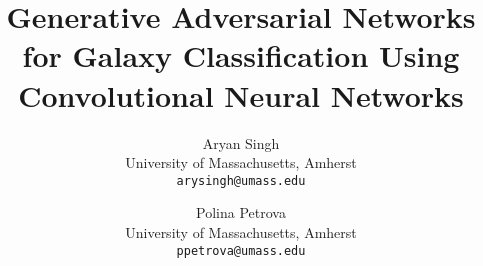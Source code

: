 \documentclass[10pt,twocolumn,letterpaper]{article}
\title{Generative Adversarial Networks for Galaxy Classification Using Convolutional Neural Networks}
\author{Aryan Singh\\
University of Massachusetts, Amherst\\
{\tt\small arysingh@umass.edu}
\and
Polina Petrova\\
University of Massachusetts, Amherst\\
{\tt\small ppetrova@umass.edu}
}
\begin{document}
\maketitle


{
    \small
    \nocite{*}
    
    
}

% 
\end{document}
